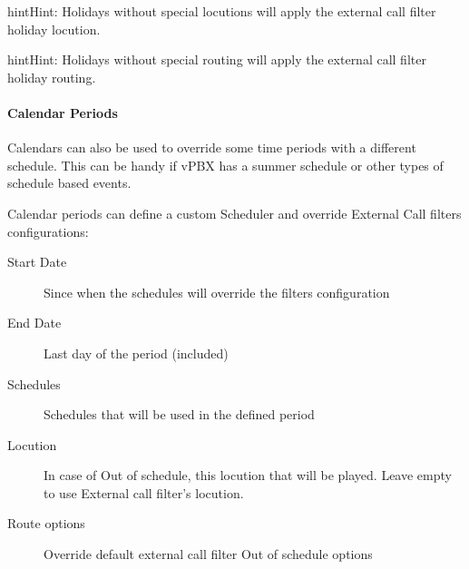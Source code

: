 \documentclass[letterpaper,10pt,english]{sphinxmanual}
\begin{document}
\begin{notice}{hint}{Hint:}
Holidays without special locutions will apply the external call filter
holiday locution.
\end{notice}

\begin{notice}{hint}{Hint:}
Holidays without special routing will apply the external call filter
holiday routing.
\end{notice}


\paragraph{Calendar Periods}
\label{administration_portal/client/vpbx/routing_tools/calendars:calendar-periods}
Calendars can also be used to override some time periods with a different schedule.
This can be handy if vPBX has a summer schedule or other types of schedule based events.

Calendar periods can define a custom Scheduler and override External Call filters configurations:
\begin{description}
\item[{Start Date}] \leavevmode{}\label{administration_portal/client/vpbx/routing_tools/calendars:term-start-date}
Since when the schedules will override the filters configuration

\item[{End Date}] \leavevmode{}\label{administration_portal/client/vpbx/routing_tools/calendars:term-end-date}
Last day of the period (included)

\item[{Schedules}] \leavevmode{}\label{administration_portal/client/vpbx/routing_tools/calendars:term-schedules}
Schedules that will be used in the defined period

\item[{Locution}] \leavevmode{}\label{administration_portal/client/vpbx/routing_tools/calendars:term-9}
In case of Out of schedule, this locution that will be played. Leave empty to use External
call filter's locution.

\item[{Route options}] \leavevmode{}\label{administration_portal/client/vpbx/routing_tools/calendars:term-route-options}
Override default external call filter Out of schedule options

\end{description}
\end{document}
